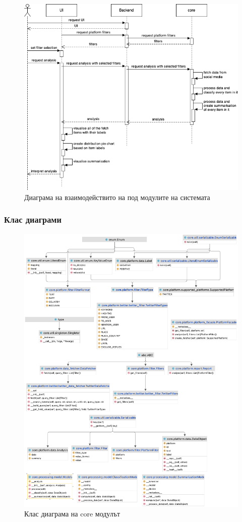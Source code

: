 \documentclass{article}
\newcounter{subsubsubsection}[subsubsection]
\begin{document}
\newpage\begin{figure}[H]
  \centering
  \captionsetup{justification=centering}
  \includegraphics[width=450px, keepaspectratio]{chapter-04/flow.png}
  \caption{Диаграма на взаимодействито на под модулите на системата}
\end{figure}

\subsubsection{Клас диаграми}


\newpage\begin{figure}[H]
  \centering
  \captionsetup{justification=centering}
  \includegraphics[width=450px, keepaspectratio]{chapter-04/core.png}
  \caption{Клас диаграма на core модулът}
\end{figure}
\end{document}
